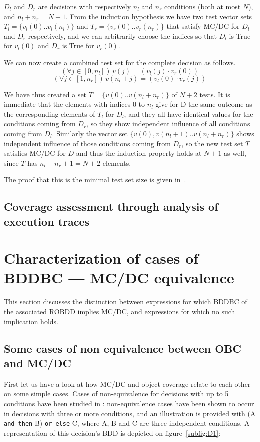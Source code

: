 \documentclass[a4paper,12pt,twoside]{article}
\newcommand{\andthen}{\texttt{and then}}
\newcommand{\orelse}{\texttt{or else}}
\begin{document}
$D_l$ and $D_r$ are decisions with respectively $n_l$ and $n_r$ conditions
(both at most $N$), and $n_l + n_r = N+1$. From the induction hypothesis
we have two test vector sets $T_l = \{ v_l (0) .. v_l (n_l) \}$ and
$T_r = \{ v_r (0) .. v_r (n_r) \}$ that satisfy MC/DC for $D_l$ and $D_r$
respectively, and we can arbitrarily choose the indices so that
$D_l$ is True for $v_l(0)$ and $D_r$ is True for $v_r (0)$.

We can now create a combined test set for the complete decision as follows.
$$(\forall j \in [0, n_l])\, v (j) = (v_l (j) \cdot v_r (0))$$
$$(\forall j \in [1, n_r])\, v (n_l + j) = (v_l (0) \cdot v_r (j))$$

We have thus created a set $T = \{ v(0) .. v(n_l + n_r) \}$ of $N+2$ tests.
It is immediate that the elements with indices 0 to $n_l$ give for D
the same outcome as the corresponding elements of $T_l$ for $D_l$,
and they all have identical values for the conditions coming from $D_r$,
so they show independent influence of all conditions coming from $D_l$.
Similarly the vector set $\{v(0), v(n_l+1) .. v(n_l + n_r)\}$ shows
independent influence of those conditions coming from $D_r$, so the new
test set $T$ satisfies MC/DC for $D$ and thus the induction property holds at
$N+1$ as well, since $T$ has $n_l + n_r + 1 = N+2$ elements.

The proof that this is the minimal test set size is given in~\cite{ar0118}.

\subsection{Coverage assessment through analysis of execution traces}


\section{Characterization of cases of BDDBC --- MC/DC equivalence}

This section discusses the distinction between expressions for which
BDDBC of the associated ROBDD implies MC/DC, and expressions for which
no such implication holds.

\subsection{Some cases of non equivalence between OBC and MC/DC}

First let us have a look at how MC/DC and object coverage relate to each
other on some simple cases. Cases of non-equivalence for decisions with up to
5 conditions have been studied in \cite{ar0720}: non-equivalence cases
have been shown to occur in decisions with three or more conditions,
and an illustration is provided with (A \andthen{} B) \orelse{} C,
where A, B and C are three independent conditions.
%
A representation of this decision's BDD is depicted on
figure~\ref{subfig:D1}:
\end{document}
